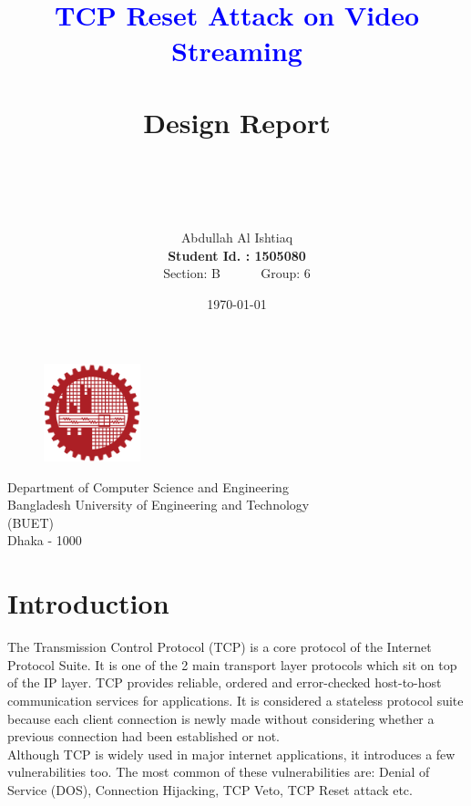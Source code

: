 \documentclass[14pt]{extarticle}
\title{\Huge{\textcolor{blue}{TCP Reset Attack on Video Streaming}} \\ ~\\
        \LARGE{Design Report} \\ ~ \\ ~ \\ }
\author{Abdullah Al Ishtiaq \\
        \textbf{Student Id. : 1505080} \\ 
        Section: B ~~~~~ Group: 6}
\date{\today}
\begin{document}
\maketitle

\vspace{1cm}

\begin{figure}[h!]
\centering
    \includegraphics[width = 0.25\textwidth]{Pictures/logoBUET.png}
\end{figure}
\begin{center}
\vspace{.5cm}

\Large{Department of Computer Science and Engineering \\
    Bangladesh University of Engineering and Technology \\
    (BUET) \\
    Dhaka - 1000 }

\end{center}

\newpage

\tableofcontents
\newpage

\listoffigures
\newpage


\section{Introduction}
    The Transmission Control Protocol (TCP) is a core protocol of the Internet Protocol Suite. It is one of the 2 main transport layer protocols which sit on top of the IP layer. TCP provides reliable, ordered and error-checked host-to-host communication services for applications. It is considered a stateless protocol suite because each client connection is newly made without considering whether a previous connection had been established or not. \\
    Although TCP is widely used in major internet applications, it introduces a few vulnerabilities too. The most common of these vulnerabilities are: Denial of Service (DOS), Connection Hijacking, TCP Veto, TCP Reset attack etc.
\end{document}
